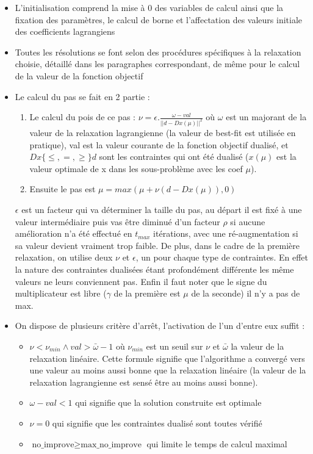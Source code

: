 \documentclass{article}
\begin{document}
\begin{itemize}
\item
L'initialisation comprend la mise à 0 des variables de calcul ainsi que la fixation des paramètres, le calcul de borne et l'affectation des valeurs initiale des coefficients lagrangiens
\item
Toutes les résolutions se font selon des procédures spécifiques à la relaxation choisie, détaillé dans les paragraphes correspondant, de même pour le calcul de la valeur de la fonction objectif
\item
Le calcul du pas se fait en 2 partie :
\begin{enumerate}[1 - ]
\item
Le calcul du pois de ce pas : $\nu = \epsilon . \frac{\omega - val}{||d - Dx(\mu)||^2}$ où $\omega$ est un majorant de la valeur de la relaxation lagrangienne (la valeur de best-fit est utilisée en pratique), val est la valeur courante de la fonction objectif dualisé, et $Dx \{\leqslant, =, \geqslant\} d$ sont les contraintes qui ont été dualisé ($x(\mu)$ est la valeur optimale de x dans les sous-problème avec les coef $\mu$).
\item
Ensuite le pas est $\mu = max(\mu + \nu ( d - Dx(\mu)), 0)$
\end{enumerate}
$\epsilon$ est un facteur qui va déterminer la taille du pas, au départ il est fixé à une valeur intermédiaire puis vas être diminué d'un facteur $\rho$ si aucune amélioration n'a été effectué en $t_{max}$ itérations, avec une ré-augmentation si sa valeur devient vraiment trop faible. De plus, dans le cadre de la première relaxation, on utilise deux $\nu$ et $\epsilon$, un pour chaque type de contraintes. En effet la nature des contraintes dualisées étant profondément différente les même valeurs ne leurs conviennent pas. Enfin il faut noter que le signe du multiplicateur est libre ($\gamma$ de la première est $\mu$ de la seconde)  il n'y a pas de max.
\item
On dispose de plusieurs critère d’arrêt, l'activation de l'un d'entre eux suffit :
\begin{itemize}
\item
$\nu < \nu_{min} \land val > \bar{\omega} -1$ où $\nu_{min}$ est un seuil sur $\nu$ et $\bar{\omega}$ la valeur de la relaxation linéaire. Cette formule signifie que l'algorithme a convergé vers une valeur au moins aussi bonne que la relaxation linéaire (la valeur de la relaxation lagrangienne est sensé être au moins aussi bonne).
\item
$\omega - val < 1$ qui signifie que la solution construite est optimale
\item
$\nu = 0$ qui signifie que les contraintes dualisé sont toutes vérifié
\item
$\text{no\_improve} \geqslant \text{max\_no\_improve}$ qui limite le temps de calcul maximal
\end{itemize}
\end{itemize}
\end{document}
